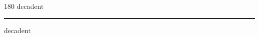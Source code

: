 
\begin{frame}
\begin{center}
\begin{turn}{180}
{\fontsize{2.5cm}{1em}\selectfont decadent}
\end{turn}
\vspace{1em}\par  
\hrule
\vspace{1em}\par  
{\fontsize{2.5cm}{1em}\selectfont decadent}
\end{center}
\end{frame}
